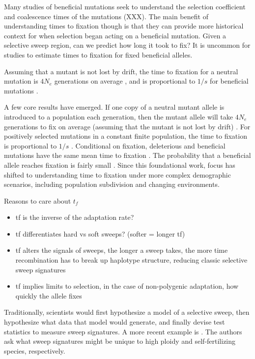 Many studies of beneficial mutations seek to understand the selection coefficient and coalescence times of the mutations (XXX). The main benefit of understanding times to fixation though is that they can provide more historical context for when selection began acting on a beneficial mutation. Given a selective sweep region, can we predict how long it took to fix? It is uncommon for studies to estimate times to fixation for fixed beneficial alleles.



Assuming that a mutant is not lost by drift, the time to fixation for a neutral mutation is $4N_e$ generations on average \citep{kimura_average_1969}, and is proportional to $1/s$ for beneficial mutations \citep{otto_fixation_2013}. 

A few core results have emerged. If one copy of a neutral mutant allele is introduced to a population each generation, then the mutant allele will take $4N_e$ generations to fix on average (assuming that the mutant is not lost by drift) \citep{kimura_average_1969}. For positively selected mutations in a constant finite population, the time to fixation is proportional to $1/s$ \citep{otto_fixation_2013}. Conditional on fixation, deleterious and beneficial mutations have the same mean time to fixation \citep{otto_fixation_2013}. The probability that a beneficial allele reaches fixation is fairly small \citep{haldane_mathematical_1927, zhao_characteristic_2013}. Since this foundational work, focus has shifted to understanding time to fixation under more complex demographic scenarios, including population subdivision and changing environments. 




Reasons to care about $t_f$

\begin{itemize}
    \item tf is the inverse of the adaptation rate?
    \item tf differentiates hard vs soft sweeps? (softer = longer tf)
    \item tf alters the signals of sweeps, the longer a sweep takes, the more time recombination has to break up haplotype structure, reducing classic selective sweep signatures
    \item tf implies limits to selection, in the case of non-polygenic adaptation, how quickly the allele fixes
\end{itemize}




Traditionally, scientists would first hypothesize a model of a selective sweep, then hypothesize what data that model would generate, and finally devise test statistics to measure sweep signatures. A more recent example is \citet{monnahan_effect_2020, hartfield_selective_2020}. The authors ask what sweep signatures might be unique to high ploidy and self-fertilizing species, respectively.   

